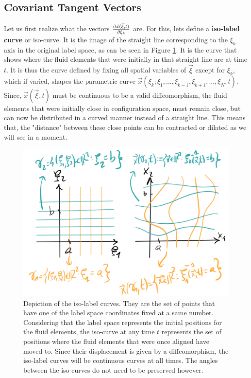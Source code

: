 \documentclass[11pt, a4paper]{article} %
\begin{document}
\subsection*{ Covariant Tangent Vectors \vspace{-0.3cm}}
Let us first realize what the vectors $\pdv{\vec{x}(\vec{\xi},t)}{\xi_k}$ are. For this, lets define a {\bf iso-label curve} or iso-curve. It is the image of the straight line corresponding to the $\xi_k$ axis in the original label space, as can be seen in Figure \ref{fig:isoline}.  It is the curve that shows where the fluid elements that were initially in that straight line are at time $t$. It is thus the curve defined by fixing all spatial variables of $\vec{\xi}$ except for $\xi_k$, which if varied, shapes the parametric curve $\vec{x}(\xi_k;\xi_1,...,\xi_{k-1},\xi_{k+1},...,\xi_N,t)$. Since, $\vec{x}(\vec{\xi},t)$ must be continuous to be a valid diffeomorphism, the fluid elements that were initially close in configuration space, must remain close, but can now be distributed in a curved manner instead of a straight line. This means that, the "distance" between these close points can be contracted or dilated as we will see in a moment.
\begin{figure}[h!]
  \centering
    \includegraphics[width=0.65\linewidth]{5isolines.png}
  \caption{Depiction of the iso-label curves. They are the set of points that have one of the label space coordinates fixed at a same number. Considering that the label space represents the initial positions for the fluid elements, the iso-curve at any time $t$ represents the set of positions where the fluid elements that were once aligned have moved to. Since their displacement is given by a diffeomorphism, the iso-label curves will be continuous curves at all times. The angles between the iso-curves do not need to be preserved however. }
  \label{fig:isoline}
\end{figure}
\end{document}
